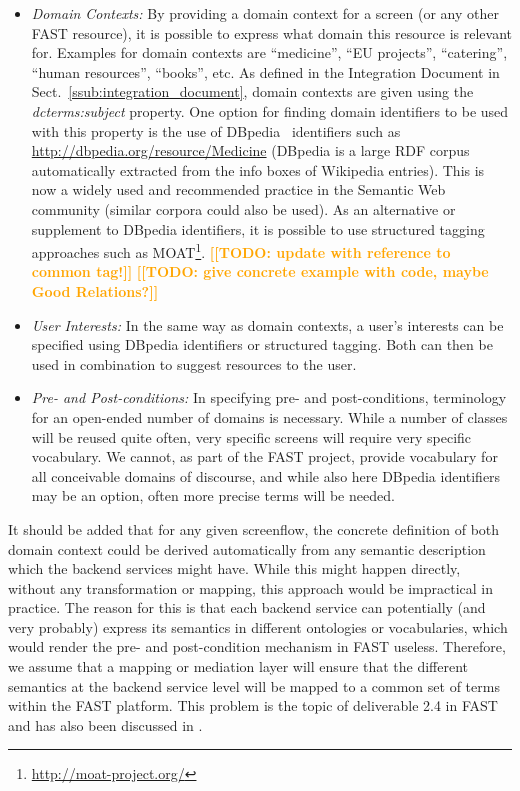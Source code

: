 \documentclass[twoside]{fast_latex}
\newcommand{\todo}[1]{\textsf{\textbf{\textcolor{Orange}{[[TODO: #1]]}}}}
\newcommand{\todo}[1]{}
\begin{document}
\begin{itemize}
	\item \emph{Domain Contexts:} By providing a domain context for a screen (or any other FAST resource), it is possible to express what domain this resource is relevant for. Examples for domain contexts are ``medicine'', ``EU projects'', ``catering'', ``human resources'', ``books'', etc. As defined in the Integration Document in Sect.~\ref{ssub:integration_document}, domain contexts are given using the \emph{dcterms:subject} property. One option for finding domain identifiers to be used with this property is the use of DBpedia~\cite{Auer07dbpedia} identifiers such as \url{http://dbpedia.org/resource/Medicine} (DBpedia is a large RDF corpus automatically extracted from the info boxes of Wikipedia entries). This is now a widely used and recommended practice in the Semantic Web community (similar corpora could also be used). As an alternative or supplement to DBpedia identifiers, it is possible to use structured tagging approaches such as MOAT\footnote{\url{http://moat-project.org/}}.
	\todo{update with reference to common tag!}
	\todo{give concrete example with code, maybe Good Relations?}
	\item \emph{User Interests:} In the same way as domain contexts, a user's interests can be specified using DBpedia identifiers or structured tagging. Both can then be used in combination to suggest resources to the user.
	\item \emph{Pre- and Post-conditions:} In specifying pre- and post-conditions, terminology for an open-ended number of domains is necessary. While a number of classes will be reused quite often, very specific screens will require very specific vocabulary. We cannot, as part of the FAST project, provide vocabulary for all conceivable domains of discourse, and while also here DBpedia identifiers may be an option, often more precise terms will be needed.
\end{itemize}

It should be added that for any given screenflow, the concrete definition of both domain context could be derived automatically from any semantic description which the backend services might have. While this might happen directly, without any transformation or mapping, this approach would be impractical in practice. The reason for this is that each backend service can potentially (and very probably) express its semantics in different ontologies or vocabularies, which would render the pre- and post-condition mechanism in FAST useless. Therefore, we assume that a mapping or mediation layer will ensure that the different semantics at the backend service level will be mapped to a common set of terms within the FAST platform. This problem is the topic of deliverable 2.4 in FAST~\cite{ambrus2010fast_mediation} and has also been discussed in \cite{Ambrus:2009it}.
\end{document}
